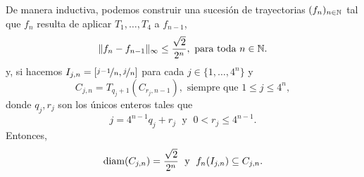 De manera inductiva, podemos construir una sucesión de trayectorias $(f_n)_{n\in \mathbb{N}}$ tal que $f_{n}$ resulta de aplicar $T_1,\ldots, T_4$ a $f_{n-1}$,  
$$\|f_{n}-f_{n-1}\|_\infty\leq \frac{\sqrt{2}}{2^n},\text{ para toda } n\in \mathbb{N}.$$
y, si hacemos $I_{j,n}=[\nicefrac{j-1}{n},\nicefrac{j}{n}]$ para cada $j\in\{1,\ldots,4^n\}$ y 
\begin{equation*}
    C_{j,n}=T_{q_j+1}(C_{r_j,n-1}), \text{ siempre que } 1\leq j\leq 4^n,
\end{equation*}
donde $q_j,r_j$ son los únicos enteros tales que
\[
j=4^{n-1}q_j+r_j \;\text{ y }\; 0<r_j\leq 4^{n-1}.
\]
Entonces, 
\begin{equation*}
\text{diam}(C_{j,n})=\frac{\sqrt{2}}{2^n}\text{\; y \;}
    f_n(I_{j,n})\subseteq C_{j,n}.
\end{equation*}

